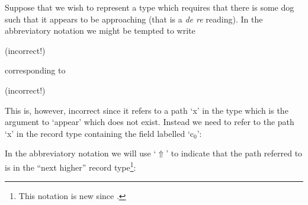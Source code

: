 Suppose that we wish to represent a type which requires that there is
some dog such that it appears to be approaching (that is a \textit{de
  re} reading).  In the abbreviatory notation we might be tempted to
write
\begin{display}
      (incorrect!)
\end{display}
corresponding to
\begin{display}
 (incorrect!)
\end{display}
This is, however, incorrect since it refers to a path `x' in the type
which is the argument to `appear' which does not exist.  Instead we
need to refer to the path `x' in the record type containing the field
labelled `c$_0$':
\begin{display}
\end{display}
In the abbreviatory notation we will use `$\Uparrow$' to indicate that
the path referred to is in the ``next higher'' record
type\footnote{This notation is new since \cite{Cooper2012}.}:
\begin{display}
\end{display}

